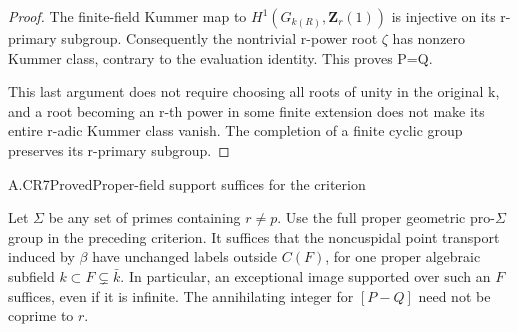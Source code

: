 \begin{proof}
The finite-field Kummer map to \(H^1(G_{k(R)},\mathbf{Z}_r(1))\) is injective on its r-primary subgroup. Consequently the nontrivial r-power root \({\zeta}\) has nonzero Kummer class, contrary to the evaluation identity. This proves P=Q.

This last argument does not require choosing all roots of unity in the original k, and a root becoming an r-th power in some finite extension does not make its entire r-adic Kummer class vanish. The completion of a finite cyclic group preserves its r-primary subgroup.


\end{proof}

\begin{claim}{A.CR7}{Proved}{Proper-field support suffices for the criterion}

Let $\Sigma$ be any set of primes containing $r\ne p$.
Use the full proper geometric pro-$\Sigma$ group in the preceding
criterion. It suffices that the noncuspidal point transport induced
by $\beta$ have unchanged labels outside $C(F)$, for one proper
algebraic subfield $k\subset F\subsetneq\bar k$. In particular,
an exceptional image supported over such an $F$ suffices, even if it
is infinite. The annihilating integer for $[P-Q]$ need not be
coprime to $r$.

\end{claim}

